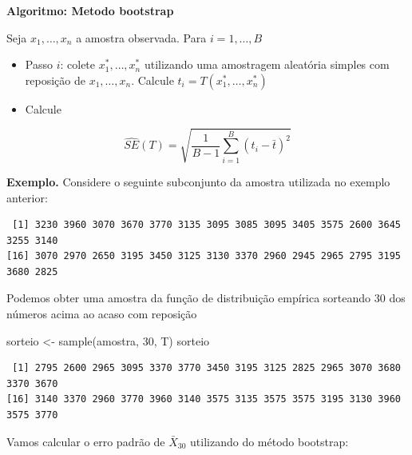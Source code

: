 \documentclass[
  letterpaper,
  DIV=11,
  numbers=noendperiod]{scrartcl}
\newenvironment{Shaded}{\begin{snugshade}}{\end{snugshade}}
\newcommand{\DecValTok}[1]{\textcolor[rgb]{0.68,0.00,0.00}{#1}}
\newcommand{\FunctionTok}[1]{\textcolor[rgb]{0.28,0.35,0.67}{#1}}
\newcommand{\NormalTok}[1]{\textcolor[rgb]{0.00,0.23,0.31}{#1}}
\newcommand{\OtherTok}[1]{\textcolor[rgb]{0.00,0.23,0.31}{#1}}
\newcommand{\SpecialCharTok}[1]{\textcolor[rgb]{0.37,0.37,0.37}{#1}}
\begin{document}
\textbf{Algoritmo: Metodo bootstrap}

Seja \(x_1,\ldots,x_n\) a amostra observada. Para \(i=1,\ldots,B\)

\begin{itemize}
\item
  Passo \(i\): colete \(x_1^*,\ldots,x_n^*\) utilizando uma amostragem
  aleatória simples com reposição de \(x_1,\ldots,x_n\). Calcule
  \(t_i=T(x_1^*,\ldots,x_n^*)\)
\item
  Calcule
\end{itemize}

\[\widehat{SE}(T)=\sqrt{\frac{1}{B-1}\sum_{i=1}^B(t_i-\bar{t})^2}\]

\textbf{Exemplo.} Considere o seguinte subconjunto da amostra utilizada
no exemplo anterior:

\begin{Shaded}
\end{Shaded}

\begin{verbatim}
 [1] 3230 3960 3070 3670 3770 3135 3095 3085 3095 3405 3575 2600 3645 3255 3140
[16] 3070 2970 2650 3195 3450 3125 3130 3370 2960 2945 2965 2795 3195 3680 2825
\end{verbatim}

Podemos obter uma amostra da função de distribuição empírica sorteando
30 dos números acima ao acaso com reposição

\begin{Shaded}
\begin{Highlighting}[]
\NormalTok{sorteio }\OtherTok{\textless{}{-}} \FunctionTok{sample}\NormalTok{(amostra, }\DecValTok{30}\NormalTok{, T)}
\NormalTok{sorteio}
\end{Highlighting}
\end{Shaded}

\begin{verbatim}
 [1] 2795 2600 2965 3095 3370 3770 3450 3195 3125 2825 2965 3070 3680 3370 3670
[16] 3140 3370 2960 3770 3960 3140 3575 3135 3575 3575 3195 3130 3960 3575 3770
\end{verbatim}

Vamos calcular o erro padrão de \(\bar{X}_{30}\) utilizando do método
bootstrap:
\end{document}
